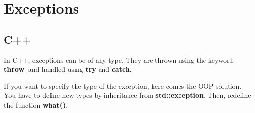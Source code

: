 \documentclass{KodeBook}
\begin{document}
%
%
%
%
%
%
%
%
%
%
%
%
%
%
%
%
%
%
%

\section{Exceptions}

\subsection{C++}

In C++, exceptions can be of any type. 
They are thrown using the keyword \textbf{throw}, and handled using \textbf{try} and \textbf{catch}.



If you want to specify the type of the exception, here comes the OOP solution. 
You have to define new types by inheritance from \textbf{std::exception}. 
Then, redefine the function \textbf{what()}.
\end{document}
